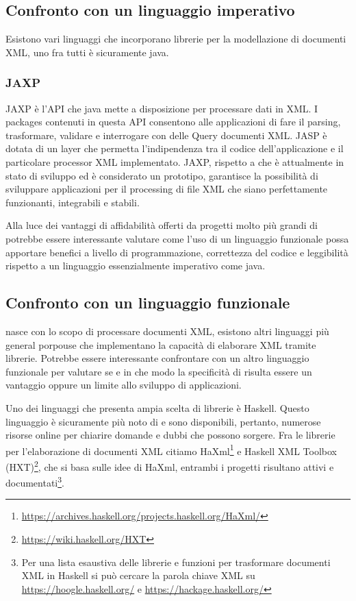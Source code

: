 \subsection{Confronto con un linguaggio imperativo}
Esistono vari linguaggi che incorporano librerie per la modellazione di documenti XML, uno fra tutti è sicuramente java.
\subsubsection{JAXP}
JAXP \cite{JAXP} è l'API che java mette a disposizione per processare dati in XML. I packages contenuti in questa API consentono alle applicazioni di fare il parsing, trasformare, validare e interrogare con delle Query documenti XML. JASP è dotata di un layer che permetta l'indipendenza tra il codice dell'applicazione e il particolare processor XML implementato. JAXP, rispetto a \cduce che è attualmente in stato di sviluppo ed è considerato un prototipo, garantisce la possibilità di sviluppare applicazioni per il processing di file XML che siano perfettamente funzionanti, integrabili e stabili.

Alla luce dei vantaggi di affidabilità offerti da progetti molto più grandi di \cduce potrebbe essere interessante valutare come l'uso di un linguaggio funzionale possa apportare benefici a livello di programmazione, correttezza del codice e leggibilità rispetto a un linguaggio essenzialmente imperativo come java.
\subsection{Confronto con un linguaggio funzionale}
\cduce nasce con lo scopo di processare documenti XML, esistono altri linguaggi più general porpouse che implementano la capacità di elaborare XML tramite librerie. Potrebbe essere interessante confrontare \cduce con un altro linguaggio funzionale per valutare se e in che modo la specificità di \cduce risulta essere un vantaggio oppure un limite allo sviluppo di applicazioni.

Uno dei linguaggi che presenta ampia scelta di librerie è Haskell. Questo linguaggio è sicuramente più noto di \cduce e sono disponibili, pertanto, numerose risorse online per chiarire domande e dubbi che possono sorgere. Fra le librerie per l'elaborazione di documenti XML citiamo HaXml\footnote{\url{https://archives.haskell.org/projects.haskell.org/HaXml/}} e Haskell XML Toolbox (HXT)\footnote{\url{https://wiki.haskell.org/HXT}}, che si basa sulle idee di HaXml, entrambi i progetti risultano attivi e documentati\footnote{Per una lista esaustiva delle librerie e funzioni per trasformare documenti XML in Haskell si può cercare la parola chiave XML su \url{https://hoogle.haskell.org/} e \url{https://hackage.haskell.org/}}.

